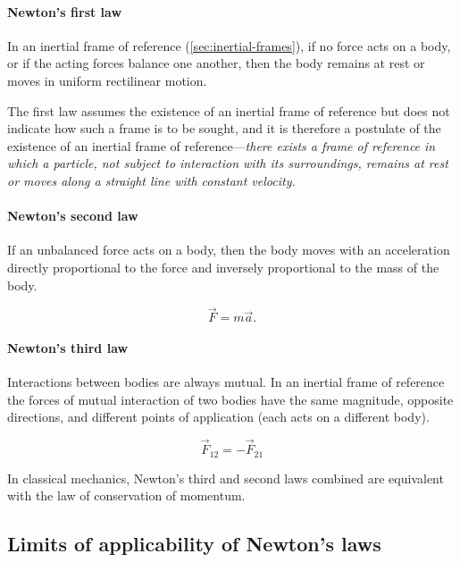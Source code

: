     \paragraph{Newton's first law}

        In an inertial frame of reference (\cref{sec:inertial-frames}), if no force acts on a body, or if the acting forces balance one another, then the body remains at rest or moves in uniform rectilinear motion.

        The first law assumes the existence of an inertial frame of reference but does not indicate how such a frame is to be sought, and it is therefore a postulate of the existence of an inertial frame of reference---\textit{there exists a frame of reference in which a particle, not subject to interaction with its surroundings, remains at rest or moves along a straight line with constant velocity.}

    \paragraph{Newton's second law}

        If an unbalanced force acts on a body, then the body moves with an acceleration directly proportional to the force and inversely proportional to the mass of the body.

        \begin{equation}\label{eq:newton2}
            \vec{F} = m \vec{a}.
        \end{equation}

    \paragraph{Newton's third law}

        Interactions between bodies are always mutual. In an inertial frame of reference the forces of mutual interaction of two bodies have the same magnitude, opposite directions, and different points of application (each acts on a different body).

        \begin{equation}\label{eq:newton3}
            \vec{F}_{12} = -\vec{F}_{21}
        \end{equation}

        In classical mechanics, Newton's third and second laws combined are equivalent with the law of conservation of momentum.

    \subsection{Limits of applicability of Newton's laws}

